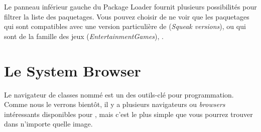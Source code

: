 \documentclass[a4paper,10pt,twoside]{book}
\begin{document}


Le panneau inf\'erieur gauche du \sqmap Package Loader fournit
plusieurs possibilit\'es pour filtrer la liste des paquetages. Vous
pouvez choisir de ne voir que les paquetages qui sont compatibles avec
une version particuli\`ere de \sq
(\emph{Squeak versions}), 
ou qui sont de la famille des jeux
(\emph{Entertainment\go{}Games}), 
\etc.

\section{Le System Browser}

Le navigateur de classes nomm\'e  est un des
outils-cl\'e pour programmation.
Comme nous le verrons bient\^ot, il y a plusieurs navigateurs ou
\emph{browsers} int\'eressants disponibles pour \sq, mais c'est le
plus simple que vous pourrez trouver dans n'importe quelle image.

\end{document}
